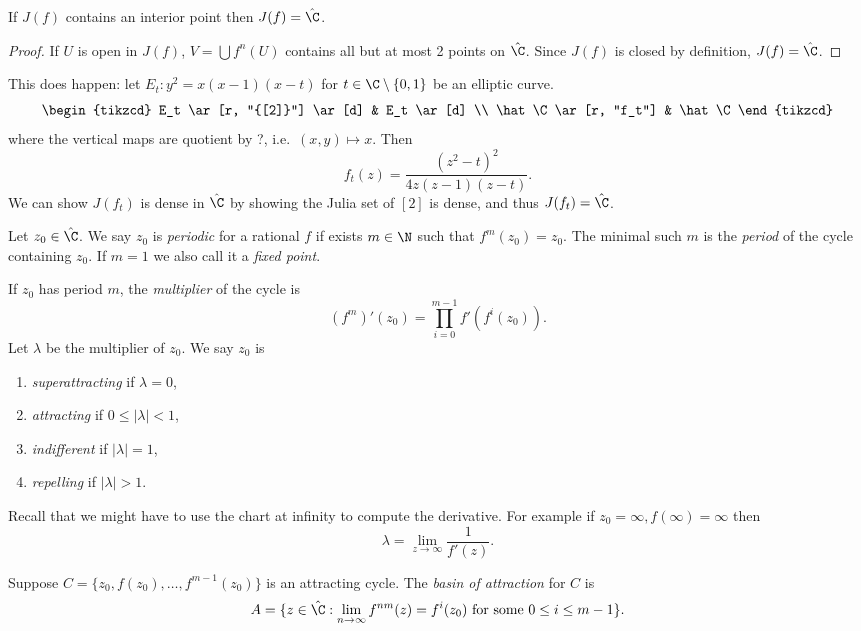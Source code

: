 \documentclass[a4paper]{article}
\begin{document}
\begin{corollary}
  If \(J(f)\) contains an interior point then \(J(f) = \hat \C\).
\end{corollary}

\begin{proof}
  If \(U\) is open in \(J(f)\), \(V = \bigcup f^n(U)\) contains all but at most 2 points on \(\hat \C\). Since \(J(f)\) is closed by definition, \(J(f) = \hat \C\).
\end{proof}

This does happen: let \(E_t: y^2 = x(x - 1)(x - t)\) for \(t \in \C \setminus \{0, 1\}\) be an elliptic curve.
\[
  \begin{tikzcd}
    E_t \ar[r, "{[2]}"] \ar[d] & E_t \ar[d] \\
    \hat \C \ar[r, "f_t"] & \hat \C
  \end{tikzcd}
\]
where the vertical maps are quotient by ?, i.e.\ \((x, y) \mapsto x\). Then
\[
  f_t(z) = \frac{(z^2 - t)^2}{4z(z-1)(z - t)}.
\]
We can show \(J(f_t)\) is dense in \(\hat \C\) by showing the Julia set of \([2]\) is dense, and thus \(J(f_t) = \hat \C\).

\begin{definition}
  Let \(z_0 \in \hat \C\). We say \(z_0\) is \emph{periodic} for a rational \(f\) if exists \(m \in \N\) such that \(f^m(z_0) = z_0\). The minimal such \(m\) is the \emph{period} of the cycle containing \(z_0\). If \(m = 1\) we also call it a \emph{fixed point}.

  If \(z_0\) has period \(m\), the \emph{multiplier} of the cycle is
  \[
    (f^m)'(z_0) = \prod_{i = 0}^{m - 1} f'(f^i(z_0)).
  \]
  Let \(\lambda\) be the multiplier of \(z_0\). We say \(z_0\) is
  \begin{enumerate}
  \item \emph{superattracting} if \(\lambda = 0\),
  \item \emph{attracting} if \(0 \leq |\lambda| < 1\),
  \item \emph{indifferent} if \(|\lambda| = 1\),
  \item \emph{repelling} if \(|\lambda| > 1\).
  \end{enumerate}
\end{definition}
Recall that we might have to use the chart at infinity to compute the derivative. For example if \(z_0 = \infty, f(\infty) = \infty\) then
\[
  \lambda = \lim_{z \to \infty} \frac{1}{f'(z)}.
\]

\begin{definition}
  Suppose \(C = \{z_0, f(z_0), \dots, f^{m - 1}(z_0)\}\) is an attracting cycle. The \emph{basin of attraction} for \(C\) is
  \[
    A = \{z \in \hat \C: \lim_{n \to \infty} f^{nm}(z) = f^i(z_0) \text{ for some } 0 \leq i \leq m - 1\}.
  \]
\end{definition}
\end{document}
